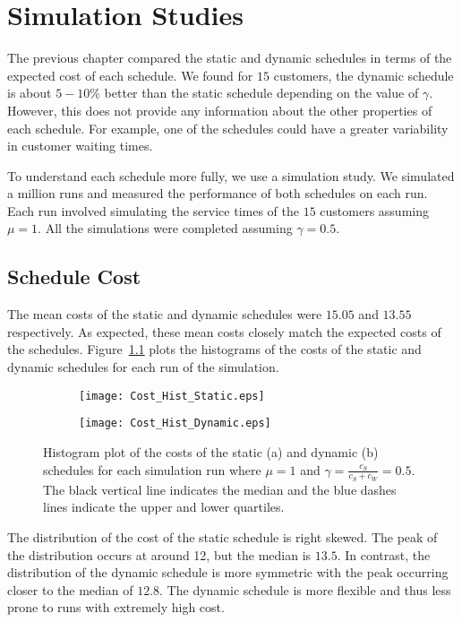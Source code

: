 \chapter{Simulation Studies}
\label{chap:Simulation}
The previous chapter compared the static and dynamic schedules in terms of the expected cost of each schedule. We found for $15$ customers, the dynamic schedule is about $5 - 10 \%$ better than the static schedule depending on the value of $\gamma$. However, this does not provide any information about the other properties of each schedule. For example, one of the schedules could have a greater variability in customer waiting times.

To understand each schedule more fully, we use a simulation study. We simulated a million runs and measured the performance of both schedules on each run. Each run involved simulating the service times of the $15$ customers assuming $\mu = 1$. All the simulations were completed assuming $\gamma = 0.5$.

\section{Schedule Cost}
The mean costs of the static and dynamic schedules were $15.05$ and $13.55$ respectively. As expected, these mean costs closely match the expected costs of the schedules. Figure~\ref{fig:Two_Cost} plots the histograms of the costs of the static and dynamic schedules for each run of the simulation.
\begin{figure}[htb]
	\centering
	\begin{subfigure}[t]{0.45\textwidth}
		\centering
		\texttt{[image: Cost\_Hist\_Static.eps]}
		\caption{}
	\end{subfigure}
	\begin{subfigure}[t]{0.45\textwidth}
		\centering
		\texttt{[image: Cost\_Hist\_Dynamic.eps]}
		\caption{}
	\end{subfigure}
	\caption{Histogram plot of the costs of the static (a) and dynamic (b) schedules for each simulation run where $\mu = 1$ and $\gamma = \frac{c_{S}}{c_{S} + c_{W}} = 0.5$. The black vertical line indicates the median and the blue dashes lines indicate the upper and lower quartiles.}
	\label{fig:Two_Cost}
\end{figure}

The distribution of the cost of the static schedule is right skewed. The peak of the distribution occurs at around 12, but the median is $13.5$. In contrast, the distribution of the dynamic schedule is more symmetric with the peak occurring closer to the median of $12.8$. The dynamic schedule is more flexible and thus less prone to runs with extremely high cost.

